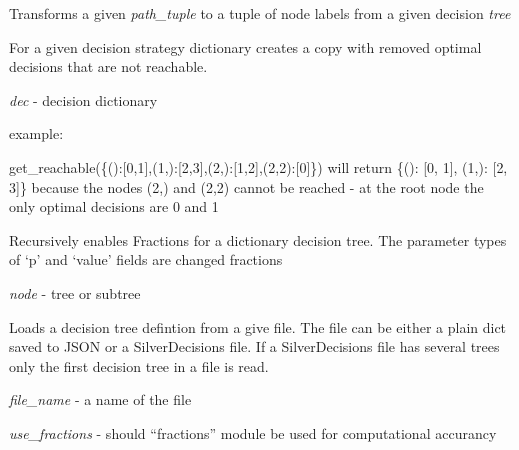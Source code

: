 \documentclass[a4paper,10pt,english]{sphinxmanual}
\begin{document}

\begin{fulllineitems}
	\label{index:chondro.get_decision_name}
	Transforms a given \emph{path\_tuple} to a tuple of node labels from 
	a given decision \emph{tree}
	
\end{fulllineitems}


\begin{fulllineitems}
	\label{index:chondro.get_reachable}
	For a given decision strategy dictionary creates a copy 
	with removed optimal decisions that are not reachable.
	
	\emph{dec} - decision dictionary
	
	example:
	
	get\_reachable(\{():{[}0,1{]},(1,):{[}2,3{]},(2,):{[}1,2{]},(2,2):{[}0{]}\})      will return  \{(): {[}0, 1{]}, (1,): {[}2, 3{]}\} because the nodes (2,) and (2,2)     cannot be reached - at the root node the only optimal decisions are 0 and 1
	
\end{fulllineitems}


\begin{fulllineitems}
	\label{index:chondro.go_fractions}
	Recursively enables Fractions for a dictionary decision tree.
	The parameter types of `p' and `value' fields are changed fractions
	
	\emph{node} - tree or subtree
	
\end{fulllineitems}


\begin{fulllineitems}
	\label{index:chondro.load_tree}
	Loads a decision tree defintion from a give file.
	The file can be either a plain dict saved to JSON or a SilverDecisions 
	file. If a SilverDecisions file has several trees only the first decision tree in a file is read.
	
	\emph{file\_name} - a name of the file
	
	\emph{use\_fractions} - should ``fractions'' module be used for computational     accurancy
	
\end{fulllineitems}
\end{document}
